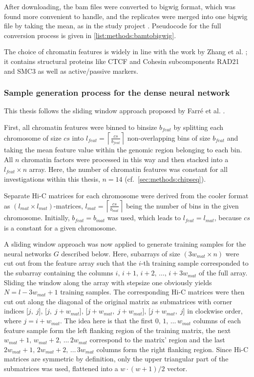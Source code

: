After downloading, the bam files were converted to bigwig format, which was found more convenient to handle, and the replicates were merged into 
one bigwig file by taking the mean, as in the study project \cite{Krauth2020}. 
Pseudocode for the full conversion process is given in \cref{list:methods:bamtobigwig}.

The choice of chromatin features is widely in line with the work by Zhang et al. \cite{Zhang2019}; it contains
structural proteins like CTCF and Cohesin subcomponents RAD21 and SMC3 as well as active/passive markers.

\subsubsection{Sample generation process for the dense neural network} \label{sec:methods:sample_gen}
This thesis follows the sliding window approach proposed by Farr\'e et al. \cite{Farre2018a}.

First, all chromatin features were binned to binsize $b_\mathit{feat}$ by splitting each chromosome of size $cs$ into 
$l_\mathit{feat}=\left \lceil{\frac{cs}{b_\mathit{feat}}}\right \rceil$ non-overlapping bins of size $b_\mathit{feat}$
and taking the mean feature value within the genomic region belonging to each bin.
All $n$ chromatin factors were processed in this way and then stacked into a $l_\mathit{feat} \times n$ array.
Here, the number of chromatin features was constant for all investigations within this thesis, $n=14$ (cf.~\cref{sec:methods:chipseq}). 

Separate Hi-C matrices for each chromosome were derived from the cooler format as $(l_\mathit{mat} \times l_\mathit{mat})$-matrices, 
$l_\mathit{mat}=\left \lceil{\frac{cs}{b_\mathit{mat}}}\right \rceil$ being the number of bins in the given chromosome. 
Initially, $b_\mathit{feat} = b_\mathit{mat}$ was used, which leads to $l_\mathit{feat} = l_\mathit{mat}$, because $cs$ is a constant for a given chromosome.

A sliding window approach was now applied to generate training samples for the neural networks $G$ described below.
Here, subarrays of size $(3w_\mathit{mat} \times n)$ were cut out from the feature array 
such that the $i$-th training sample corresponded to the subarray containing the columns $i,\,i+1,\,i+2,\,\dots,\,i+3w_\mathit{mat}$ of the full array. 
Sliding the window along the array with stepsize one obviously yields $N=l-3w_\mathit{mat}+1$ training samples.
The corresponding Hi-C matrices were then cut out along the diagonal of the original matrix 
as submatrices with corner indices [$j,\;j$], [$j,\;j+w_\mathit{mat}$], [$j+w_\mathit{mat},\;j+w_\mathit{mat}$], [$j+w_\mathit{mat},\;j$] in clockwise order, where $j=i+w_\mathit{mat}$.
The idea here is that the first $0,\,1,\,\dots \,w_\mathit{mat}$ columns of each feature sample form the left flanking region of the training matrix, 
the next $w_\mathit{mat}+1,\,w_\mathit{mat}+2,\,\dots \,2w_\mathit{mat}$ correspond to the matrix' region and the last $2w_\mathit{mat}+1,\,2w_\mathit{mat}+2,\,\dots \,3w_\mathit{mat}$ columns form the right flanking region.
Since Hi-C matrices are symmetric by definition, only the upper triangular part of the submatrices was used, 
flattened into a $w\cdot (w+1)/2$ vector.

